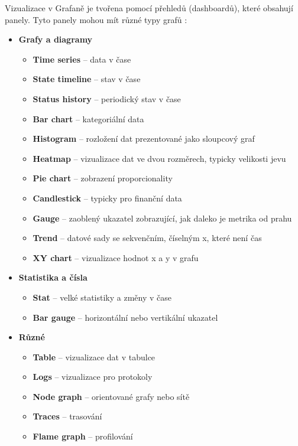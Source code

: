 Vizualizace v Grafaně je tvořena pomocí přehledů (dashboardů), které obsahují panely. Tyto panely mohou mít různé typy grafů \cite{GrafanaVisualization}:
\begin{itemize}
    \item \textbf{Grafy a diagramy}
    \begin{itemize}
        \item \textbf{Time series} – data v čase
        \item \textbf{State timeline} – stav v čase
        \item \textbf{Status history} – periodický stav v čase
        \item \textbf{Bar chart} – kategoriální data
        \item \textbf{Histogram} – rozložení dat prezentované jako sloupcový graf
        \item \textbf{Heatmap} – vizualizace dat ve dvou rozměrech, typicky velikosti jevu
        \item \textbf{Pie chart} – zobrazení proporcionality
        \item \textbf{Candlestick} – typicky pro finanční data
        \item \textbf{Gauge} – zaoblený ukazatel zobrazující, jak daleko je metrika od prahu
        \item \textbf{Trend} – datové sady se sekvenčním, číselným x, které není čas
        \item \textbf{XY chart} – vizualizace hodnot x a y v grafu
    \end{itemize}
    \item \textbf{Statistika a čísla}
    \begin{itemize}
        \item \textbf{Stat} – velké statistiky a změny v čase
        \item \textbf{Bar gauge} – horizontální nebo vertikální ukazatel
    \end{itemize}
    \item \textbf{Různé}
    \begin{itemize}
        \item \textbf{Table} – vizualizace dat v tabulce
        \item \textbf{Logs} – vizualizace pro protokoly
        \item \textbf{Node graph} – orientované grafy nebo sítě
        \item \textbf{Traces} – trasování
        \item \textbf{Flame graph} – profilování

\end{itemize}
\end{itemize}

